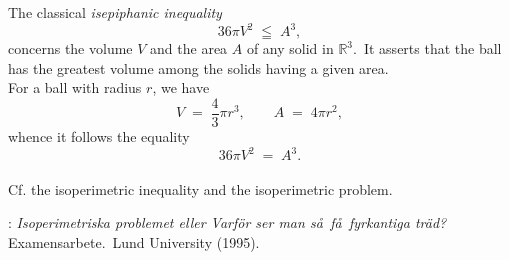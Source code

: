 \documentclass[12pt]{article}
\theoremstyle{definition}
\begin{document}
The classical \emph{isepiphanic inequality} 
 $$36\pi V^2 \;\leqq\; A^3,$$
concerns the volume $V$ and the area $A$ of any solid in $\mathbb{R}^3$.\, It asserts that the ball has the greatest volume among the solids having a given area.\\

For a ball with radius $r$, we have
$$V \;=\; \frac{4}{3}\pi r^3, \qquad A \;=\; 4\pi r^2,$$
whence it follows the equality
 $$36\pi V^2 \;=\; A^3.$$\\
Cf. the isoperimetric inequality and the isoperimetric problem.

\begin{thebibliography}{8}
: {\em Isoperimetriska problemet eller Varf\"or ser man s\aa\, f\aa\, fyrkantiga tr\"ad?}\, Examensarbete.\, Lund University (1995). 
\end{thebibliography}

\end{document}
